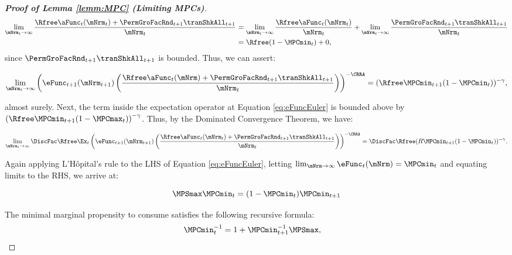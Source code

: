 \documentclass[\econtexRoot/BufferStockTheory]{subfiles}
\begin{document}
\begin{proof}[\textbf{Proof of Lemma \ref{lemm:MPC} (Limiting MPCs)}]
\begin{align}
\lim_{\mNrm_{t}\rightarrow \infty}\frac{\Rfree \aFunc_{t}(\mNrm_{t})+{\PermGroFacRnd}_{t+1}{\tranShkAll}_{t+1}}{\mNrm_{t}} &  = \lim_{\mNrm_{t}\rightarrow \infty}\frac{\Rfree \aFunc_{t}(\mNrm_{t})}{\mNrm_{t}} + \lim_{\mNrm_{t}\rightarrow \infty}\frac{{\PermGroFacRnd}_{t+1}{\tranShkAll}_{t+1}}{\mNrm_{t}} \\
			& = \Rfree (1- \MPCmin_{t}) + 0, 
\end{align}
since ${\PermGroFacRnd}_{t+1}{\tranShkAll}_{t+1}$ is bounded. Thus, we can assert:

\begin{equation}
\lim_{\mNrm_{t}\rightarrow \infty}{\left(\eFunc_{t+1}({\mNrm}_{t+1})\left(\frac{\Rfree \aFunc_{t}(\mNrm)+{\PermGroFacRnd}_{t+1}{\tranShkAll}_{t+1}}{\mNrm_{t}}\right)\right)}^{-\CRRA } = (\Rfree\MPCmin_{t+1}(1-\MPCmin_{t}))^{-\gamma}, 
\end{equation}

almost surely. Next, the term inside the expectation operator at Equation \eqref{eq:eFuncEuler} is bounded above by $\left(\Rfree\MPCmin_{t+1}(1-\MPCmax_{t})\right)^{-\gamma}$. Thus, by the Dominated Convergence Theorem, we have:

\begin{equation}\label{eq:eFuncEulerMPCmaxDCT}
\lim_{\mNrm_{t}\rightarrow \infty}{\DiscFac \Rfree \Ex_{t}\left(\eFunc_{t+1}({\mNrm}_{t+1})\left(\frac{\Rfree \aFunc_{t}(\mNrm_{t})+{\PermGroFacRnd}_{t+1}{\tranShkAll}_{t+1}}{\mNrm_{t}}\right)\right)}^{-\CRRA } = \DiscFac \Rfree(R\MPCmin_{t+1}(1-\MPCmin_{t}))^{-\gamma}. 
\end{equation}

Again applying L'H\^opital's rule to the LHS of Equation \eqref{eq:eFuncEuler}, letting $\lim_{\mNrm \rightarrow \infty} \eFunc_{t}(\mNrm) = \MPCmin_{t}$ and equating limits to the RHS, we arrive at: \hypertarget{MPCnvrs}{}

\begin{equation*}
 \MPSmax \MPCmin_{t}  =  (1-\MPCmin_{t}) \MPCmin_{t+1}
\end{equation*}

The minimal marginal propensity to consume satisfies the following recursive formula:
\begin{equation}\begin{gathered}\begin{aligned}
 \MPCmin_{t}^{-1}  & = 1+\MPCmin_{t+1}^{-1}\MPSmax,  \label{eq:MPCminInvApndx}
\end{aligned}\end{gathered}\end{equation}


\end{proof}
\end{document}
